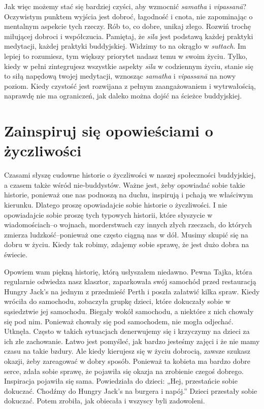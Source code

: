 \documentclass[12pt,openany]{book}
\begin{document}
Jak więc możemy stać się bardziej czyści, aby wzmocnić \textit{samatha} i \textit{vipassanā}? Oczywistym punktem wyjścia jest dobroć, łagodność i cnota, nie zapominając o mentalnym aspekcie tych rzeczy. Rób to, co dobre, unikaj złego. Rozwiń trochę miłującej dobroci i współczucia. Pamiętaj, że \textit{sīla} jest podstawą każdej praktyki medytacji, każdej praktyki buddyjskiej. Widzimy to na okrągło w \textit{suttach}. Im lepiej to rozumiesz, tym większy priorytet nadasz temu w swoim życiu. Tylko, kiedy w pełni zintegrujesz wszystkie aspekty \textit{sīla} w codziennym życiu, stanie się to siłą napędową twojej medytacji, wznosząc \textit{samatha} i \textit{vipassanā} na nowy poziom. Kiedy czystość jest rozwijana z pełnym zaangażowaniem i wytrwałością, naprawdę nie ma ograniczeń, jak daleko można dojść na ścieżce buddyjskiej.

\section*{Zainspiruj się opowieściami o życzliwości}

Czasami słyszę cudowne historie o życzliwości w naszej społeczności buddyjskiej, a czasem także wśród nie-buddystów. Ważne jest, żeby opowiadać sobie takie historie, ponieważ one nas podnoszą na duchu, inspirują i pchają we właściwym kierunku. Dlatego proszę opowiadajcie sobie historie o życzliwości. I nie opowiadajcie sobie proszę tych typowych historii, które słyszycie w wiadomościach–o wojnach, morderstwach czy innych złych rzeczach, do których zmierza ludzkość–ponieważ one często ciągną nas w dół. Musimy skupić się na dobru w życiu. Kiedy tak robimy, zdajemy sobie sprawę, że jest dużo dobra na świecie.


Opowiem wam piękną historię, którą usłyszałem niedawno. Pewna Tajka, która regularnie odwiedza nasz klasztor, zaparkowała swój samochód przed restauracją Hungry Jack’s na jednym z przedmieść Perth i poszła załatwić kilka spraw. Kiedy wróciła do samochodu, zobaczyła grupkę dzieci, które dokuczały sobie w sąsiedztwie jej samochodu. Biegały wokół samochodu, a niektóre z nich chowały się pod nim. Ponieważ chowały się pod samochodem, nie mogła odjechać. Utknęła. Często w takich sytuacjach denerwujemy się i krzyczymy na dzieci za ich złe zachowanie. Łatwo jest pomyśleć, jak bardzo jesteśmy zajęci i że nie mamy czasu na takie bzdury. Ale kiedy kierujesz się w życiu dobrocią, zawsze szukasz okazji, żeby zareagować w dobry sposób. Ponieważ ta kobieta ma bardzo dobre serce, zdała sobie sprawę, że pojawiła się okazja na zrobienie czegoś dobrego. Inspiracja pojawiła się sama. Powiedziała do dzieci: „Hej, przestańcie sobie dokuczać. Chodźmy do Hungry Jack’s na burgera i napój.” Dzieci przestały sobie dokuczać. Potem zrobiła, jak obiecała i wszyscy byli zadowoleni.
\end{document}

